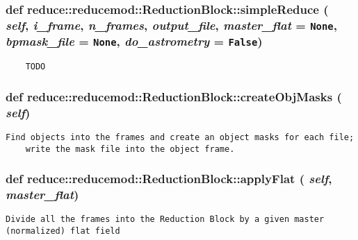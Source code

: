 \subsubsection{\setlength{\rightskip}{0pt plus 5cm}def reduce::reducemod::Reduction\-Block::simple\-Reduce ( {\em self},  {\em i\_\-frame},  {\em n\_\-frames},  {\em output\_\-file},  {\em master\_\-flat} = {\tt None},  {\em bpmask\_\-file} = {\tt None},  {\em do\_\-astrometry} = {\tt False})}\label{classreduce_1_1reducemod_1_1ReductionBlock_8e631c3c833a8bc388684a971275185b}




\footnotesize\begin{verbatim}
    TODO
\end{verbatim}
\normalsize
\subsubsection{\setlength{\rightskip}{0pt plus 5cm}def reduce::reducemod::Reduction\-Block::create\-Obj\-Masks ( {\em self})}\label{classreduce_1_1reducemod_1_1ReductionBlock_5f93b067cc7f57f00dcf91a5059b9c26}




\footnotesize\begin{verbatim}Find objects into the frames and create an object masks for each file; 
    write the mask file into the object frame.
\end{verbatim}
\normalsize
\subsubsection{\setlength{\rightskip}{0pt plus 5cm}def reduce::reducemod::Reduction\-Block::apply\-Flat ( {\em self},  {\em master\_\-flat})}\label{classreduce_1_1reducemod_1_1ReductionBlock_3036aebfd2b6ee94aa035e8005e2e7e8}




\footnotesize\begin{verbatim}Divide all the frames into the Reduction Block by a given master (normalized) flat field
\end{verbatim}
\normalsize
